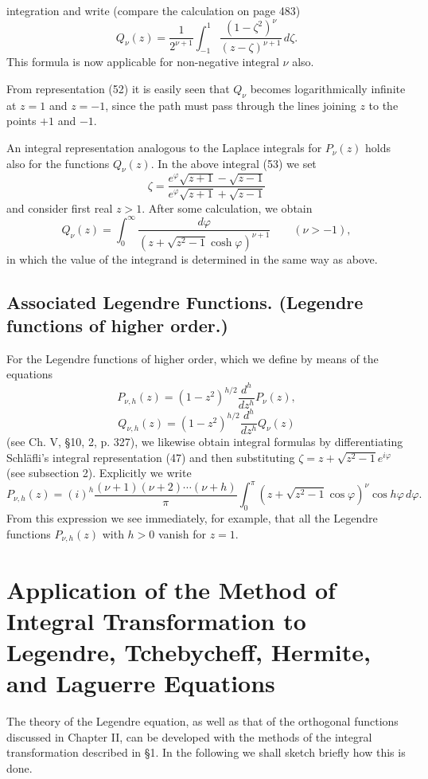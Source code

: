 integration and write (compare the calculation on page 483)
\begin{equation}\tag{53}
Q_\nu(z)=\frac1{2^{\nu+1}}\int_{-1}^{1}\frac{(1-\zeta^2)^\nu}{(z-\zeta)^{\nu+1}}\,d\zeta.
\end{equation}
This formula is now applicable for non-negative integral $\nu$ also.

From representation (52) it is easily seen that $Q_\nu$ becomes logarithmically infinite at $z=1$ and $z=-1$, since the path must pass through the lines joining $z$ to the points $+1$ and $-1$.

An integral representation analogous to the Laplace integrals for $P_\nu(z)$ holds also for the functions $Q_\nu(z)$. In the above integral (53) we set
\[
\zeta=\frac{e^\varphi\sqrt{z+1}-\sqrt{z-1}}
{e^\varphi\sqrt{z+1}+\sqrt{z-1}}
\]
and consider first real $z>1$. After some calculation, we obtain
\begin{equation}\tag{54}
Q_\nu(z)=\int_0^\infty\frac{d\varphi}
{\left(z+\sqrt{z^2-1}\cosh\varphi\right)^{\nu+1}}
\qquad(\nu>-1),
\end{equation}
in which the value of the integrand is determined in the same way as above.

\subsection{Associated Legendre Functions. (Legendre functions of higher order.)}
For the Legendre functions of higher order, which we define by means of the equations
\[
P_{\nu,h}(z)=(1-z^2)^{h/2}\frac{d^h}{dz^h}P_\nu(z),
\]
\[
Q_{\nu,h}(z)=(1-z^2)^{h/2}\frac{d^h}{dz^h}Q_\nu(z)
\]
(see Ch. V, \S10, 2, p. 327), we likewise obtain integral formulas by differentiating Schl\"afli's integral representation (47) and then substituting $\zeta=z+\sqrt{z^2-1}e^{i\varphi}$ (see subsection 2). Explicitly we write
\begin{equation}\tag{55}
P_{\nu,h}(z)=(i)^h\frac{(\nu+1)(\nu+2)\cdots(\nu+h)}\pi
\int_0^\pi\left(z+\sqrt{z^2-1}\cos\varphi\right)^\nu\cos h\varphi\,d\varphi.
\end{equation}
From this expression we see immediately, for example, that all the Legendre functions $P_{\nu,h}(z)$ with $h>0$ vanish for $z=1$.

\section{Application of the Method of Integral Transformation to Legendre, Tchebycheff, Hermite, and Laguerre Equations}
The theory of the Legendre equation, as well as that of the orthogonal functions discussed in Chapter II, can be developed with the methods of the integral transformation described in \S1. In the following we shall sketch briefly how this is done.


